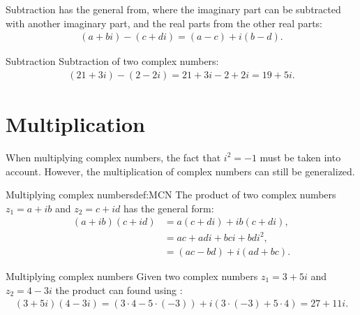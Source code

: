 \noindent 
Subtraction has the general from, where the imaginary part can be subtracted with another imaginary part, and the real parts from the other real parts:
\begin{align*}
(a + bi) - (c + di) = (a - c) + i(b - d).
\end{align*}

\begin{example}{Subtraction}{}
Subtraction of two complex numbers:
\begin{align*}
(21 + 3i) - (2 - 2i) = 21 + 3i - 2 + 2i = 19 + 5i.
\end{align*}
\end{example}

\section{Multiplication}
When multiplying complex numbers, the fact that $i^2 =-1$ must be taken into account. However, the multiplication of complex numbers can still be generalized. 
\begin{definition}{Multiplying complex numbers}{def:MCN}
The product of two complex numbers $z_1=a+ib$ and $z_2=c+id$ has the general form:
\begin{align*}
(a+ib)(c+id)&=a(c+di)+ib(c+di),
\\
&=ac+adi+bci+bdi^2,
\\
&=(ac-bd)+i(ad+bc).
\end{align*}
\end{definition}
\begin{example}{Multiplying complex numbers}{}
Given two complex numbers $z_1=3+5i$ and $z_2=4-3i$ the product can found using :
\begin{align*}
(3+5i)(4-3i) = (3\cdot4-5\cdot(-3))+i(3\cdot(-3)+5\cdot4)=27+11i.
\end{align*}
\end{example}


